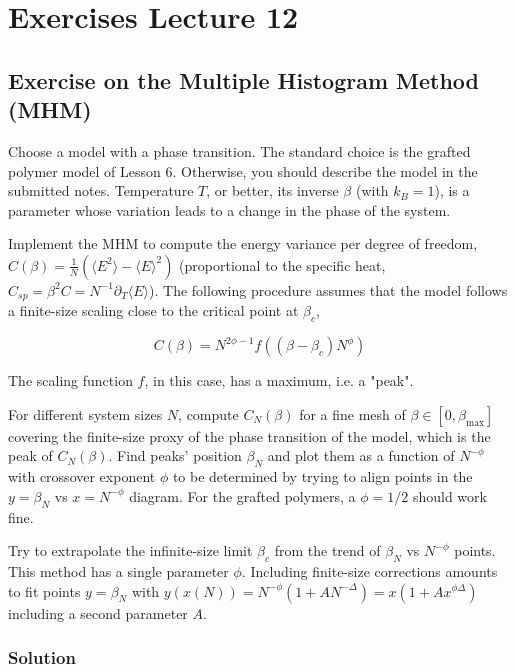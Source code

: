\documentclass[../main.tex]{subfiles}
\begin{document}
\chapter{Exercises Lecture 12}

\section{Exercise on the Multiple Histogram Method (MHM)}

Choose a model with a phase transition. The standard choice is the grafted polymer model of Lesson 6. Otherwise, you should describe the model in the submitted notes. Temperature $T$, or better, its inverse $\beta$ (with $k_B=1$), is a parameter whose variation leads to a change in the phase of the system.

Implement the MHM to compute the energy variance per degree of freedom, $C(\beta) = \frac{1}{N} (\langle E^2 \rangle - \langle E \rangle^2)$ (proportional to the specific heat, $C_{sp} = \beta^2 C = N^{-1}\partial_T \langle E \rangle$). The following procedure assumes that the model follows a finite-size scaling close to the critical point at $\beta_c$,

$$ C(\beta) = N^{2\phi-1}f\left( (\beta - \beta_c)N^\phi \right)$$

The scaling function $f$, in this case, has a maximum, i.e. a "peak".

For different system sizes $N$, compute $C_N(\beta)$ for a fine mesh of $\beta \in [0, \beta_{\text{max}}]$ covering the finite-size proxy of the phase transition of the model, which is the peak of $C_N(\beta)$. Find peaks' position $\beta_N$ and plot them as a function of $N^{-\phi}$ with crossover exponent $\phi$ to be determined by trying to align points in the $y = \beta_N$ vs $x = N^{-\phi}$ diagram. For the grafted polymers, a $\phi = 1/2$ should work fine.

Try to extrapolate the infinite-size limit $\beta_c$ from the trend of $\beta_N$ vs $N^{-\phi}$ points. This method has a single parameter $\phi$. Including finite-size corrections amounts to fit points $y = \beta_N$ with $y(x(N)) = N^{-\phi}(1 + AN^{-\Delta}) = x(1+Ax^{\phi\Delta})$ including a second parameter $A$.


\subsection{Solution}
\end{document}
